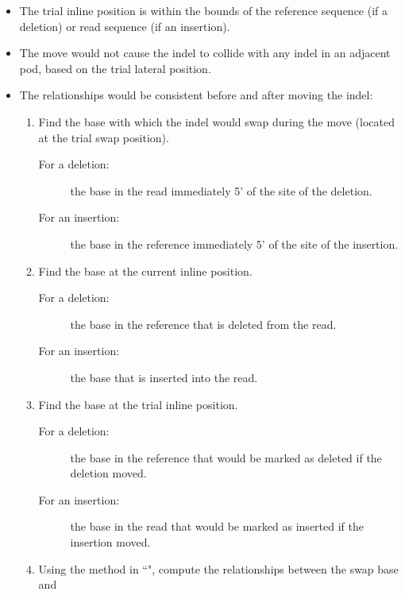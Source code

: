 \documentclass[11pt]{article}
\begin{document}
\begin{enumerate}
\begin{enumerate}
\begin{enumerate}
\begin{itemize}
                \item The trial inline position is within the bounds of the reference sequence (if a deletion) or read sequence (if an insertion).
                \item The move would not cause the indel to collide with any indel in an adjacent pod, based on the trial lateral position.
                \item The relationships would be consistent before and after moving the indel:
                \begin{enumerate}
                    \item Find the base with which the indel would swap during the move (located at the trial swap position).
                    \begin{description}
                        \item[For a deletion:] the base in the read immediately 5' of the site of the deletion.
                        \item[For an insertion:] the base in the reference immediately 5' of the site of the insertion.
                    \end{description}
                    \item Find the base at the current inline position.
                    \begin{description}
                        \item[For a deletion:] the base in the reference that is deleted from the read.
                        \item[For an insertion:] the base that is inserted into the read.
                    \end{description}
                    \item Find the base at the trial inline position.
                    \begin{description}
                        \item[For a deletion:] the base in the reference that would be marked as deleted if the deletion moved.
                        \item[For an insertion:] the base in the read that would be marked as inserted if the insertion moved.
                    \end{description}
                    \item Using the method in ``", compute the relationships between the swap base and
                    \begin{itemize}

\end{itemize}
\end{enumerate}
\end{itemize}
\end{enumerate}
\end{enumerate}
\end{enumerate}
\end{document}
